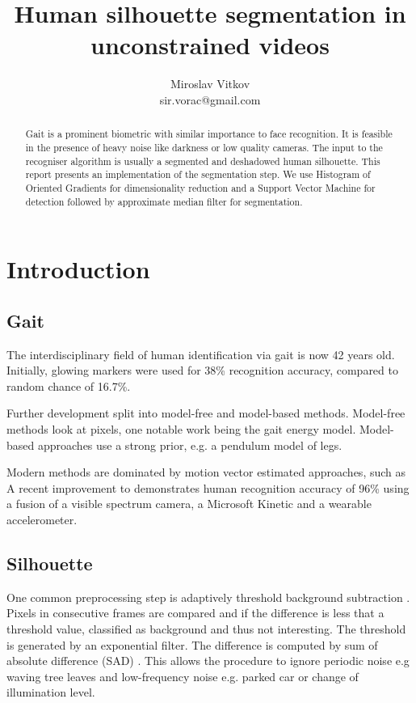 \documentclass{article}
\title{Human silhouette segmentation in unconstrained videos}
\author{Miroslav Vitkov \\ sir.vorac@gmail.com}
\begin{document}
\maketitle


\begin{abstract}
Gait is a prominent biometric with similar importance to face recognition.
It is feasible in the presence of heavy noise like darkness or low quality cameras.
The input to the recogniser algorithm is usually a segmented and deshadowed human silhouette.
This report presents an implementation of the segmentation step.
We use Histogram of Oriented Gradients for dimensionality reduction and a Support Vector Machine for detection followed by approximate median filter for segmentation.
\end{abstract}


\section{Introduction}
\subsection{Gait}
The interdisciplinary field of human identification via gait is now 42 years old.
Initially, glowing markers were used\cite{begin} for 38\% recognition accuracy, compared to random chance of 16.7\%.

Further development split into model-free and model-based methods.
Model-free methods look at pixels, one notable work being the gait energy model\cite{energy}.
Model-based approaches use a strong prior, e.g. a pendulum model of legs\cite{pendulum}.

Modern methods are dominated by motion vector estimated approaches, such as \cite{pyramid}
A recent improvement to \cite{pyramid} demonstrates human recognition accuracy of 96\% using a fusion of a visible spectrum camera, a Microsoft Kinetic and a wearable accelerometer\cite{robust}.


\subsection{Silhouette}
One common preprocessing step is adaptively threshold background subtraction \cite{vehicle}.
Pixels in consecutive frames are compared and if the difference is less that a threshold value, classified as background and thus not interesting.
The threshold is generated by an exponential filter.
The difference is computed by sum of absolute difference (SAD) \cite{background}.
This allows the procedure to ignore periodic noise e.g waving tree leaves and low-frequency noise e.g. parked car or change of illumination level.
\end{document}
